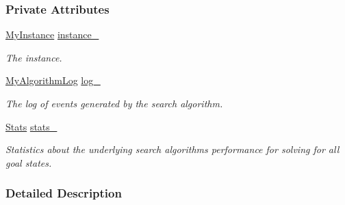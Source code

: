 \subsubsection*{Private Attributes}
\begin{DoxyCompactItemize}
\item 
\hyperlink{structslb_1_1ext_1_1algorithm_1_1PerGoal_ad7f8dd960e23262c376d6c3b5396cb67}{My\+Instance} \hyperlink{structslb_1_1ext_1_1algorithm_1_1PerGoal_a898a6c8796f6f4ce21bd4b1e53799125}{instance\+\_\+}\hypertarget{structslb_1_1ext_1_1algorithm_1_1PerGoal_a898a6c8796f6f4ce21bd4b1e53799125}{}\label{structslb_1_1ext_1_1algorithm_1_1PerGoal_a898a6c8796f6f4ce21bd4b1e53799125}

\begin{DoxyCompactList}\small\item\em The instance. \end{DoxyCompactList}\item 
\hyperlink{structslb_1_1ext_1_1algorithm_1_1PerGoal_a28d1e8e647aeaf2c2b8f6136d6839d51}{My\+Algorithm\+Log} \hyperlink{structslb_1_1ext_1_1algorithm_1_1PerGoal_a1d60d1e76d96a26e64db35a39c022999}{log\+\_\+}\hypertarget{structslb_1_1ext_1_1algorithm_1_1PerGoal_a1d60d1e76d96a26e64db35a39c022999}{}\label{structslb_1_1ext_1_1algorithm_1_1PerGoal_a1d60d1e76d96a26e64db35a39c022999}

\begin{DoxyCompactList}\small\item\em The log of events generated by the search algorithm. \end{DoxyCompactList}\item 
\hyperlink{structslb_1_1core_1_1sb_1_1Stats}{Stats} \hyperlink{structslb_1_1ext_1_1algorithm_1_1PerGoal_a9f22025280610a7a15bcba22fe29382a}{stats\+\_\+}\hypertarget{structslb_1_1ext_1_1algorithm_1_1PerGoal_a9f22025280610a7a15bcba22fe29382a}{}\label{structslb_1_1ext_1_1algorithm_1_1PerGoal_a9f22025280610a7a15bcba22fe29382a}

\begin{DoxyCompactList}\small\item\em Statistics about the underlying search algorithm\textquotesingle{}s performance for solving for all goal states. \end{DoxyCompactList}\end{DoxyCompactItemize}


\subsubsection{Detailed Description}
